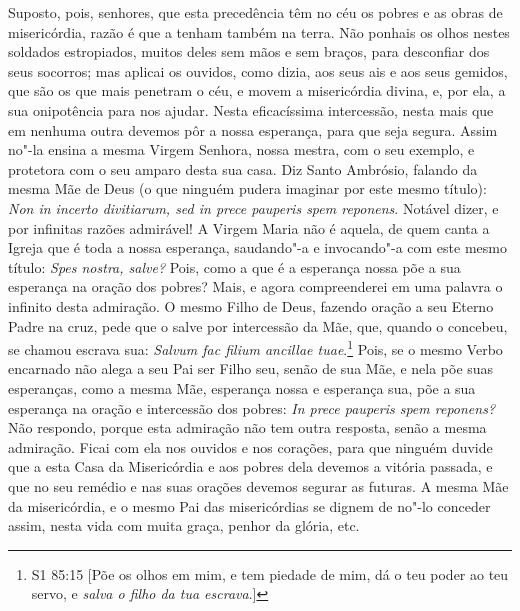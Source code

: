 Suposto, pois, senhores, que esta precedência têm no céu os pobres e as
obras de misericórdia, razão é que a tenham também na terra. Não ponhais
os olhos nestes soldados estropiados, muitos deles sem mãos e sem
braços, para desconfiar dos seus socorros; mas aplicai os ouvidos, como
dizia, aos seus ais e aos seus gemidos, que são os que mais penetram o
céu, e movem a misericórdia divina, e, por ela, a sua onipotência para
nos ajudar. Nesta eficacíssima intercessão, nesta mais que em nenhuma
outra devemos pôr a nossa esperança, para que seja segura. Assim no"-la
ensina a mesma Virgem Senhora, nossa mestra, com o seu exemplo, e
protetora com o seu amparo desta sua casa. Diz Santo Ambrósio, falando
da mesma Mãe de Deus (o que ninguém pudera imaginar por este mesmo
título): \emph{Non in incerto divitiarum, sed in prece pauperis spem
reponens}. Notável dizer, e por infinitas razões admirável! A
Virgem Maria não é aquela, de quem canta a Igreja que é toda a nossa
esperança, saudando"-a e invocando"-a com este mesmo título: \emph{Spes
nostra, salve?} Pois, como a que é a esperança nossa põe a sua esperança
na oração dos pobres? Mais, e agora compreenderei em uma palavra o
infinito desta admiração. O mesmo Filho de Deus, fazendo oração a seu
Eterno Padre na cruz, pede que o salve por intercessão da Mãe, que,
quando o concebeu, se chamou escrava sua: \emph{Salvum fac
filium ancillae tuae}.\footnote{S1 85:15 [Põe os olhos em mim, e tem piedade de mim, dá o teu poder ao teu servo, e \textit{salva o filho
da tua escrava}.]} Pois, se o mesmo Verbo encarnado não
alega a seu Pai ser Filho seu, senão de sua Mãe, e nela põe suas
esperanças, como a mesma Mãe, esperança nossa e esperança sua, põe a sua
esperança na oração e intercessão dos
pobres: \emph{In prece pauperis spem reponens?} Não respondo, porque
esta admiração não tem outra resposta, senão a mesma admiração. Ficai
com ela nos ouvidos e nos corações, para que ninguém duvide que a esta
Casa da Misericórdia e aos pobres dela devemos a vitória passada, e que
no seu remédio e nas suas orações devemos segurar as futuras. A mesma
Mãe da misericórdia, e o mesmo Pai das misericórdias se dignem de no"-lo
conceder assim, nesta vida com muita graça, penhor da glória, etc.

